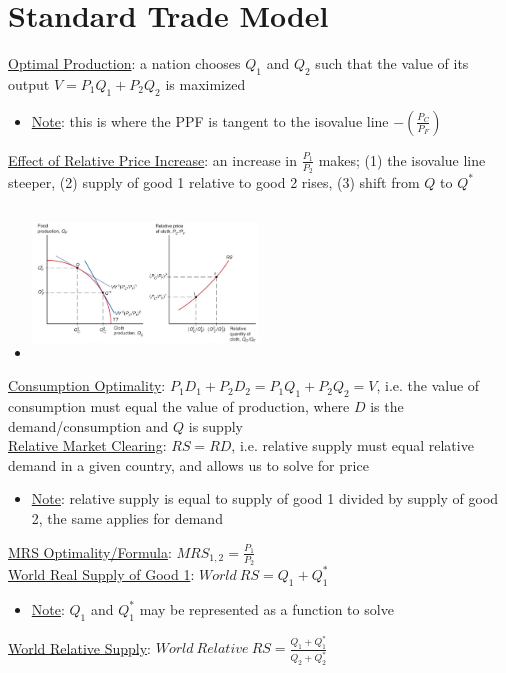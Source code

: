 \documentclass{article}
\begin{document}
\section{Standard Trade Model}
\underline{Optimal Production}: a nation chooses $Q_{1}$ and $Q_{2}$ such that the value of its output $V = P_{1}Q_{1} + P_{2}Q_{2}$ is maximized
\begin{itemize}
  \item  \underline{Note}: this is where the PPF is tangent to the isovalue line $-(\tfrac{P_{C}}{P_{F}})$
\end{itemize}
\underline{Effect of Relative Price Increase}: an increase in $\tfrac{P_{1}}{P_{2}}$ makes; (1) the isovalue line steeper, (2) supply of good 1 relative to good 2 rises, (3) shift from $Q$ to $Q^{*}$
\begin{itemize}
  \item  \includegraphics[width=6cm, height=4cm]{pic6}
\end{itemize}
\underline{Consumption Optimality}: $P_{1}D_{1} + P_{2}D_{2} = P_{1}Q_{1} + P_{2}Q_{2} = V$, i.e. the value of consumption must equal the value of production, where $D$ is the demand/consumption and $Q$ is supply  \\
\underline{Relative Market Clearing}: $RS = RD$, i.e. relative supply must equal relative demand in a given country, and allows us to solve for price
\begin{itemize}
  \item  \underline{Note}: relative supply is equal to supply of good 1 divided by supply of good 2, the same applies for demand
\end{itemize}
\underline{MRS Optimality/Formula}: $MRS_{1,2} = \tfrac{P_{1}}{P_{2}}$ \\
\underline{World Real Supply of Good 1}: $World \ RS = Q_{1} + Q_{1}^{*}$
\begin{itemize}
  \item  \underline{Note}: $Q_{1}$ and $Q_{1}^{*}$ may be represented as a function to solve
\end{itemize}
\underline{World Relative Supply}: $World \ Relative \ RS =  \tfrac{Q_{1} + Q_{1}^{*}}{Q_{2} + Q_{2}^{*}}$
\end{document}
